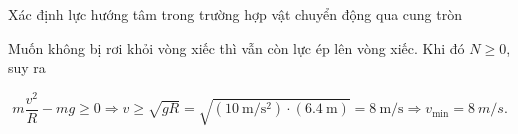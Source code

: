 \begin{dang}{Xác định lực hướng tâm trong trường hợp vật chuyển động qua cung tròn}
{{			Muốn không bị rơi khỏi vòng xiếc thì vẫn còn lực ép lên vòng xiếc. Khi đó $N \geq 0 $, suy ra
			
			$$ m \dfrac{v^2}{R}-mg \geq 0 \Rightarrow v \geq \sqrt{gR} =\sqrt{\left(\SI{10}{\meter/\second^2}\right)\cdot\left(\SI{6.4}{\meter}\right)}=\SI{8}{\meter/\second} \Rightarrow v_\text{min} = \SI{8}{m/s}.$$
		}	
	}
	
\end{dang}